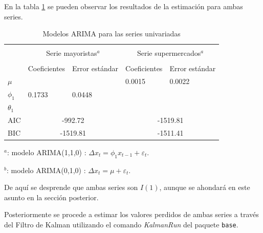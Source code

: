\documentclass[12pt, twoside]{book}\usepackage[]{graphicx}\usepackage[]{color}
\numberwithin{equation}{section}
\numberwithin{theorem}{section}
\numberwithin{teorema}{section}
\numberwithin{defi}{section}
\numberwithin{prop}{section}
\numberwithin{defi}{section}
\theoremstyle{plain}
\begin{document}
En la tabla \ref{tab:Kalman} se pueden observar los resultados de la estimación para ambas series. 
\begin{center}
\begin{table}[!htbp]
\caption{Modelos ARIMA para las series univariadas\label{tab:Kalman}}
\centering
\begin{threeparttable}
\begin{tabular}{@{}lllll@{}}
\toprule \\
\multicolumn{1}{l}{} & \multicolumn{2}{c}{Serie mayoristas$^{a}$} &
\multicolumn{2}{c}{Serie supermercados$^{a}$} \\
\cmidrule(l){2-3} \cmidrule(l){4-5} \\
\multicolumn{1}{l}{} & \multicolumn{1}{c}{Coeficientes} &
 \multicolumn{1}{c}{Error estándar} &
\multicolumn{1}{l}{Coeficientes}&
\multicolumn{1}{l}{Error estándar}
\\
\midrule
$\mu       $ &        &          & 0.0015   &  0.0022 \\
$\phi_{1}  $ & 0.1733 &  0.0448  &          &          \\
$\theta_{1}$ &        &          &          &           \\
AIC          & \multicolumn{2}{c}{-992.72}  & \multicolumn{2}{c}{-1519.81} \\
BIC          & \multicolumn{2}{c}{-1519.81} & \multicolumn{2}{c}{-1511.41} \\
\bottomrule 
\end{tabular}
\begin{tablenotes}
\small 
\item $^{a}$: modelo ARIMA(1,1,0) : $\Delta x_{t}=\phi_{1}x_{t-1}+\varepsilon_{t}$. 
\item $^{b}$: modelo ARIMA(0,1,0) : $\Delta x_{t}=\mu+\varepsilon_{t}$. 
\end{tablenotes}
\end{threeparttable}
\end{table}
\end{center}

De aquí se desprende que ambas series son $I(1)$, aunque se ahondará en este asunto en la sección posterior. 

Posteriormente se procede a estimar los valores perdidos de ambas series a través del Filtro de Kalman utilizando el comando \textit{KalmanRun} del paquete \texttt{base}.
\end{document}
